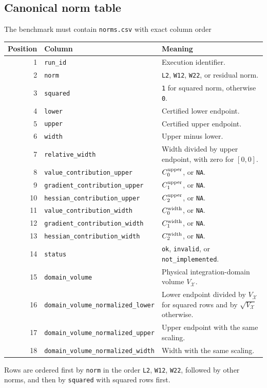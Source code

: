 \documentclass[11pt]{article}
\newcommand{\NA}{\texttt{NA}}
\begin{document}
\subsection{Canonical norm table}

The benchmark must contain \texttt{norms.csv} with exact column order
\begin{center}
\small
\begin{tabularx}{\textwidth}{@{}r l X@{}}
\toprule
Position & Column & Meaning \\
\midrule
1 & \texttt{run\_id} & Execution identifier. \\
2 & \texttt{norm} & \texttt{L2}, \texttt{W12}, \texttt{W22}, or residual norm. \\
3 & \texttt{squared} & \texttt{1} for squared norm, otherwise \texttt{0}. \\
4 & \texttt{lower} & Certified lower endpoint. \\
5 & \texttt{upper} & Certified upper endpoint. \\
6 & \texttt{width} & Upper minus lower. \\
7 & \texttt{relative\_width} & Width divided by upper endpoint, with zero for \([0,0]\). \\
8 & \texttt{value\_contribution\_upper} & \(C_0^{\rm upper}\), or \NA. \\
9 & \texttt{gradient\_contribution\_upper} & \(C_1^{\rm upper}\), or \NA. \\
10 & \texttt{hessian\_contribution\_upper} & \(C_2^{\rm upper}\), or \NA. \\
11 & \texttt{value\_contribution\_width} & \(C_0^{\rm width}\), or \NA. \\
12 & \texttt{gradient\_contribution\_width} & \(C_1^{\rm width}\), or \NA. \\
13 & \texttt{hessian\_contribution\_width} & \(C_2^{\rm width}\), or \NA. \\
14 & \texttt{status} & \texttt{ok}, \texttt{invalid}, or \texttt{not\_implemented}. \\
15 & \texttt{domain\_volume} & Physical integration-domain volume \(V_{\mathcal X}\). \\
16 & \texttt{domain\_volume\_normalized\_lower} & Lower endpoint divided by \(V_{\mathcal X}\) for squared rows and by \(\sqrt{V_{\mathcal X}}\) otherwise. \\
17 & \texttt{domain\_volume\_normalized\_upper} & Upper endpoint with the same scaling. \\
18 & \texttt{domain\_volume\_normalized\_width} & Width with the same scaling. \\
\bottomrule
\end{tabularx}
\end{center}
Rows are ordered first by \texttt{norm} in the order
\texttt{L2}, \texttt{W12}, \texttt{W22}, followed by other norms, and then by
\texttt{squared} with squared rows first.
\end{document}
